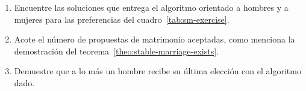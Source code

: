   \begin{enumerate}
  \item
    Encuentre las soluciones que entrega el algoritmo
    orientado a hombres y a mujeres
    para las preferencias del cuadro~\ref{tab:sm-exercise}.
    \begin{table}[ht]
      \centering
      \hspace*{2em}
      \caption{Preferencias para ejercicio}
      \label{tab:sm-exercise}
    \end{table}
  \item
    Acote el número de propuestas de matrimonio aceptadas,
    como menciona la demostración
    del teorema~\ref{theo:stable-marriage-exists}.
  \item
    Demuestre que a lo más un hombre
    recibe su última elección con el algoritmo dado.

\end{enumerate}
